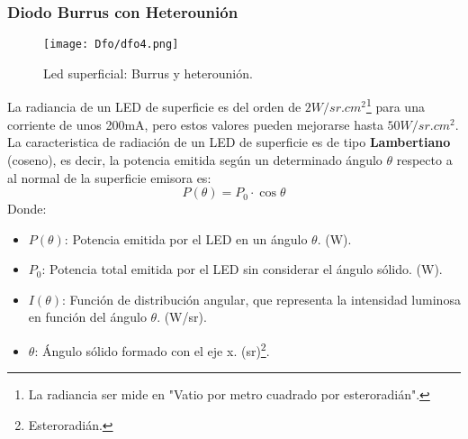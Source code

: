 \documentclass[12pt,fleqn,a4paper,oneside]{LegrandOrangeBook}
\begin{document}
\subsubsection*{Diodo Burrus con Heterounión}
\begin{figure}[H]
\centering
\texttt{[image: Dfo/dfo4.png]}
\caption{Led superficial: Burrus y heterounión.}
\end{figure}
La radiancia de un LED de superficie es del orden de $2W/sr.cm^2$\footnote{La radiancia ser mide en "Vatio por metro cuadrado por esteroradián".} para una corriente de unos 200mA, pero estos valores pueden mejorarse hasta $50W/sr.cm^2$. La caracteristica de radiación de un LED de superficie es de tipo \textbf{Lambertiano} (coseno), es decir, la potencia emitida según un determinado ángulo $\theta$ respecto a al normal de la superficie emisora es:
\begin{equation}
P(\theta)=P_0\cdot\cos\theta
\end{equation}
Donde:
\begin{itemize}
\item $P(\theta)$: Potencia emitida por el LED en un ángulo $\theta$. (W).
\item $P_0$: Potencia total emitida por el LED sin considerar el ángulo sólido. (W).
\item $I(\theta)$: Función de distribución angular, que representa la intensidad luminosa en función del ángulo $\theta$.  (W/sr).
\item $\theta$: Ángulo sólido formado con el eje x. (sr)\footnote{Esteroradián.}.
\end{itemize}
\end{document}
